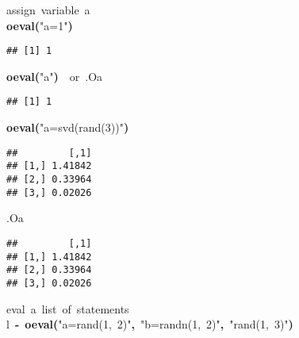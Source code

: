 \documentclass[english,10pt,a4paper]{article}\usepackage{graphicx, color}
\makeatletter
\newcommand{\hlfunctioncall}[1]{\textcolor[rgb]{0.501960784313725,0,0.329411764705882}{\textbf{#1}}}%
\newcommand{\hlstring}[1]{\textcolor[rgb]{0.6,0.6,1}{#1}}%
\newcommand{\hlkeyword}[1]{\textcolor[rgb]{0,0,0}{\textbf{#1}}}%
\newcommand{\hlcomment}[1]{\textcolor[rgb]{0.180392156862745,0.6,0.341176470588235}{#1}}%
\newcommand{\hlassignement}[1]{\textcolor[rgb]{0,0,0}{\textbf{#1}}}%
\newcommand{\hlsymbol}[1]{\textcolor[rgb]{0,0,0}{#1}}%
\newcommand{\hlstd}[1]{\textcolor[rgb]{0,0,0}{#1}}%
\newenvironment{kframe}{%
 \def\FrameCommand##1{\hskip\@totalleftmargin \hskip-\fboxsep
 \colorbox{shadecolor}{##1}\hskip-\fboxsep
     \hskip-\linewidth \hskip-\@totalleftmargin \hskip\columnwidth}%
 \MakeFramed {\advance\hsize-\width
   \@totalleftmargin\z@ \linewidth\hsize
   \@setminipage}}%
 {\par\unskip\endMakeFramed}
\newenvironment{knitrout}{}{} %
\makeatother
\begin{document}
\begin{knitrout}
\color{fgcolor}\begin{kframe}
\begin{flushleft}
\ttfamily\noindent
\hlcomment{\usebox{\hlnormalsizeboxhash}{\ }assign{\ }variable{\ }\usebox{\hlnormalsizeboxsinglequote}a\usebox{\hlnormalsizeboxsinglequote}}\hspace*{\fill}\\
\hlstd{}\hlfunctioncall{o\usebox{\hlnormalsizeboxunderscore}eval}\hlkeyword{(}\hlstring{"{}a=1"{}}\hlkeyword{)}\mbox{}
\normalfont
\end{flushleft}
\begin{verbatim}
## [1] 1
\end{verbatim}
\begin{flushleft}
\ttfamily\noindent
\hlfunctioncall{o\usebox{\hlnormalsizeboxunderscore}eval}\hlkeyword{(}\hlstring{"{}a"{}}\hlkeyword{)}{\ }{\ }\hlcomment{\usebox{\hlnormalsizeboxhash}{\ }or{\ }.O\usebox{\hlnormalsizeboxdollar}a}\mbox{}
\normalfont
\end{flushleft}
\begin{verbatim}
## [1] 1
\end{verbatim}
\begin{flushleft}
\ttfamily\noindent
\hlfunctioncall{o\usebox{\hlnormalsizeboxunderscore}eval}\hlkeyword{(}\hlstring{"{}a=svd(rand(3))"{}}\hlkeyword{)}\mbox{}
\normalfont
\end{flushleft}
\begin{verbatim}
##         [,1]
## [1,] 1.41842
## [2,] 0.33964
## [3,] 0.02026
\end{verbatim}
\begin{flushleft}
\ttfamily\noindent
\hlsymbol{.O}\hlkeyword{\usebox{\hlnormalsizeboxdollar}}\hlsymbol{a}\mbox{}
\normalfont
\end{flushleft}
\begin{verbatim}
##         [,1]
## [1,] 1.41842
## [2,] 0.33964
## [3,] 0.02026
\end{verbatim}
\begin{flushleft}
\ttfamily\noindent
\hlcomment{\usebox{\hlnormalsizeboxhash}{\ }eval{\ }a{\ }list{\ }of{\ }statements}\hspace*{\fill}\\
\hlstd{}\hlsymbol{l}{\ }\hlassignement{\usebox{\hlnormalsizeboxlessthan}-}{\ }\hlfunctioncall{o\usebox{\hlnormalsizeboxunderscore}eval}\hlkeyword{(}\hlstring{"{}a=rand(1,{\ }2)"{}}\hlkeyword{,}{\ }\hlstring{"{}b=randn(1,{\ }2)"{}}\hlkeyword{,}{\ }\hlstring{"{}rand(1,{\ }3)"{}}\hlkeyword{)}\hspace*{\fill}\\

\end{flushleft}
\end{kframe}
\end{knitrout}
\end{document}
